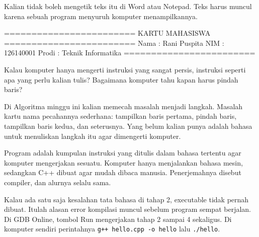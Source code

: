 \documentclass[a4paper]{article}
\begin{document}
Kalian tidak boleh mengetik teks itu di Word atau Notepad. Teks harus muncul karena sebuah program menyuruh komputer menampilkannya.

\begin{MKeluaran}[title={Tampilan yang diinginkan}]
========================
    KARTU MAHASISWA
========================
Nama  : Rani Puspita
NIM   : 126140001
Prodi : Teknik Informatika
========================
\end{MKeluaran}
\begin{Tebak}
Kalau komputer hanya mengerti instruksi yang sangat persis, instruksi seperti apa yang perlu kalian tulis? Bagaimana komputer tahu kapan harus pindah baris?
\end{Tebak}
\begin{Jawaban}
Di Algoritma minggu ini kalian memecah masalah menjadi langkah. Masalah kartu nama pecahannya sederhana: tampilkan baris pertama, pindah baris, tampilkan baris kedua, dan seterusnya. Yang belum kalian punya adalah bahasa untuk menuliskan langkah itu agar dimengerti komputer.
\end{Jawaban}
Program adalah kumpulan instruksi yang ditulis dalam bahasa tertentu agar komputer mengerjakan sesuatu. Komputer hanya menjalankan bahasa mesin, sedangkan C++ dibuat agar mudah dibaca manusia. Penerjemahnya disebut compiler, dan alurnya selalu sama.

\par\vspace{4pt}\par\vspace{6pt}
Kalau ada satu saja kesalahan tata bahasa di tahap 2, executable tidak pernah dibuat. Itulah alasan error kompilasi muncul sebelum program sempat berjalan. Di GDB Online, tombol Run mengerjakan tahap 2 sampai 4 sekaligus. Di komputer sendiri perintahnya \texttt{g++ hello.cpp -o hello} lalu \texttt{./hello}.
\end{document}

